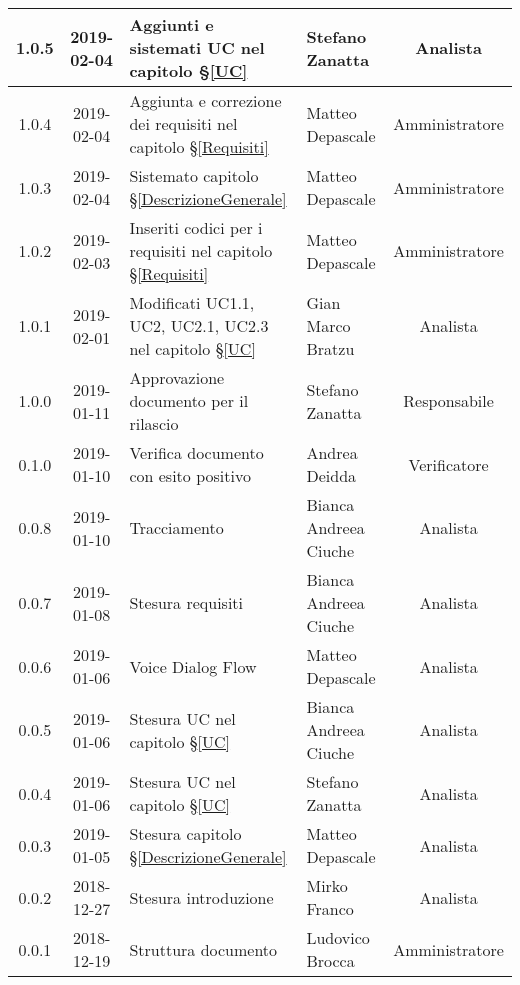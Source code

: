 \begin{center}
\begin{tabularx}{\textwidth}{|c|c|X|X|c|}
			\hline
			1.0.5 & 2019-02-04 & Aggiunti e sistemati UC nel capitolo \S\ref{UC}& Stefano Zanatta & Analista\\
			\hline
			1.0.4 & 2019-02-04 & Aggiunta e correzione dei requisiti nel capitolo \S\ref{Requisiti}& Matteo Depascale & Amministratore\\
			\hline
			1.0.3 & 2019-02-04 & Sistemato capitolo \S\ref{DescrizioneGenerale}& Matteo Depascale & Amministratore\\
			\hline
			1.0.2 & 2019-02-03 & Inseriti codici per i requisiti nel capitolo \S\ref{Requisiti}& Matteo Depascale & Amministratore\\
			\hline
			1.0.1 & 2019-02-01 & Modificati UC1.1, UC2, UC2.1, UC2.3 nel capitolo \S\ref{UC}& Gian Marco Bratzu & Analista\\
			\hline
			1.0.0 & 2019-01-11 & Approvazione documento per il rilascio& Stefano Zanatta & Responsabile\\
			\hline
			0.1.0 & 2019-01-10 & Verifica documento con esito positivo& Andrea Deidda & Verificatore\\
			\hline
			0.0.8 & 2019-01-10 & Tracciamento& Bianca Andreea Ciuche& Analista\\
			\hline
			0.0.7 & 2019-01-08 & Stesura requisiti & Bianca Andreea Ciuche& Analista\\
			\hline
			0.0.6 & 2019-01-06 & Voice Dialog Flow & Matteo Depascale & Analista\\
			\hline
			0.0.5 & 2019-01-06 & Stesura UC nel capitolo \S\ref{UC}& Bianca Andreea Ciuche & Analista\\
			\hline
			0.0.4 & 2019-01-06 & Stesura UC nel capitolo \S\ref{UC}& Stefano Zanatta & Analista\\
			\hline
			0.0.3 & 2019-01-05 & Stesura capitolo \S\ref{DescrizioneGenerale}& Matteo Depascale & Analista\\
			\hline
			0.0.2 & 2018-12-27 & Stesura introduzione & Mirko Franco & Analista\\
			\hline
			0.0.1 & 2018-12-19 & Struttura documento & Ludovico Brocca & Amministratore\\
			\hline
		\end{tabularx}
	\end{center}
\newpage